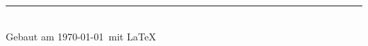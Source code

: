 \documentclass[12pt,landscape]{article}
\begin{document}
\begin{multicols}{3}
\rule{0.3\linewidth}{0.25pt}
\scriptsize \\
Gebaut am \today\ mit \LaTeX
\end{multicols}
\end{document}
